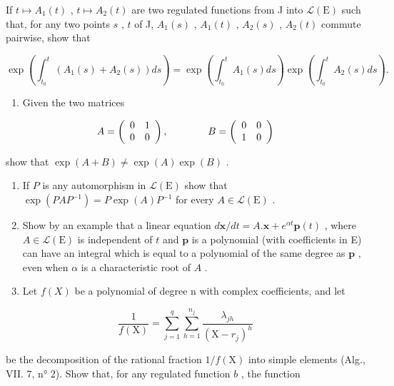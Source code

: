 If \(t \mapsto A_1(t)\) , \(t \mapsto A_2(t)\) are two regulated functions from J into \(\mathcal{L}(\mathrm{E})\) such that, for any two points \(s\) , \(t\) of J, \(A_1(s)\) , \(A_1(t)\) , \(A_2(s)\) , \(A_2(t)\) commute pairwise, show that

\[
\exp \left(\int_ {t _ {0}} ^ {t} \left(A _ {1} (s) + A _ {2} (s)\right) d s\right) = \exp \left(\int_ {t _ {0}} ^ {t} A _ {1} (s) d s\right) \exp \left(\int_ {t _ {0}} ^ {t} A _ {2} (s) d s\right).
\]

\begin{enumerate}
\def\labelenumi{\arabic{enumi})}
\setcounter{enumi}{2}
\tightlist
\item
  Given the two matrices
\end{enumerate}

\[
A = \left( \begin{array}{c c} 0 & 1 \\ 0 & 0 \end{array} \right), \qquad \qquad B = \left( \begin{array}{c c} 0 & 0 \\ 1 & 0 \end{array} \right)
\]

show that \(\exp(A+B)\neq\exp(A)\exp(B)\) .

\begin{enumerate}
\def\labelenumi{\arabic{enumi})}
\setcounter{enumi}{3}
\item
  If \(P\) is any automorphism in \(\mathcal{L}(\mathrm{E})\) show that \(\exp(PAP^{-1}) = P\exp(A)P^{-1}\) for every \(A \in \mathcal{L}(\mathrm{E})\) .
\item
  Show by an example that a linear equation \(d\mathbf{x} / dt = A.\mathbf{x} + e^{\alpha t}\mathbf{p}(t)\) , where \(A \in \mathcal{L}(\mathrm{E})\) is independent of \(t\) and \(\mathbf{p}\) is a polynomial (with coefficients in E) can have an integral which is equal to a polynomial of the same degree as \(\mathbf{p}\) , even when \(\alpha\) is a characteristic root of \(A\) .
\item
  Let \(f(X)\) be a polynomial of degree n with complex coefficients, and let
\end{enumerate}

\[
\frac {1}{f (\mathrm{X})} = \sum_ {j = 1} ^ {q} \sum_ {h = 1} ^ {n _ {j}} \frac {\lambda_ {j h}}{(\mathrm{X} - r _ {j}) ^ {h}}
\]

be the decomposition of the rational fraction \(1 / f(\mathrm{X})\) into simple elements (Alg., VII. 7, n° 2). Show that, for any regulated function \(b\) , the function

